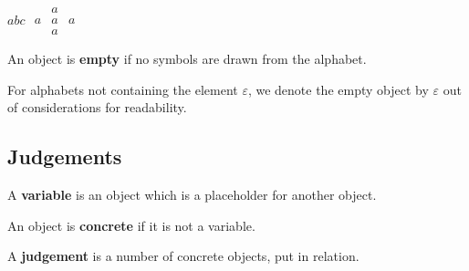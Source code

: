 \begin{center}
$abc$
\quad\quad\quad
$\begin{matrix}
  & a &   \\
a & a & a \\
  & a &
\end{matrix}$
\quad\quad\quad
{}

\end{center}

\begin{definition}

An object is \textbf{empty} if no symbols are drawn from the alphabet.

\end{definition}

\begin{notation}

For alphabets not containing the element $\varepsilon$, we denote the empty
object by $\varepsilon$ out of considerations for readability.

\end{notation}

\subsection{Judgements}

\begin{definition}

A \textbf{variable} is an object which is a placeholder for another object.

\end{definition}

\begin{definition}

An object is \textbf{concrete} if it is not a variable.

\end{definition}

\begin{definition}

A \textbf{judgement} is a number of concrete objects, put in relation.

\end{definition}

